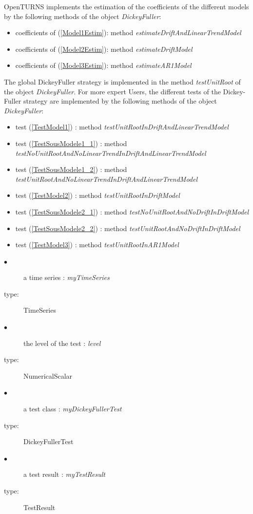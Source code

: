OpenTURNS implements the estimation of the coefficients of the different models by the following methods of the object \emph{DickeyFuller}:
\begin{itemize}
\item coefficients of (\ref{Model1Estim}): method \emph{estimateDriftAndLinearTrendModel}
\item coefficients of (\ref{Model2Estim}): method \emph{estimateDriftModel}
\item coefficients of (\ref{Model3Estim}): method \emph{estimateAR1Model}
\end{itemize}


The global DickeyFuller strategy  is implemented in the method \emph{testUnitRoot} of the object \emph{DickeyFuller}. For more expert Users, the different tests of the Dickey-Fuller strategy are implemented by the following methods of the object \emph{DickeyFuller}:
\begin{itemize}
\item test (\ref{TestModel1}) : method \emph{testUnitRootInDriftAndLinearTrendModel}
\item test (\ref{TestSousModele1_1}) : method \emph{testNoUnitRootAndNoLinearTrendInDriftAndLinearTrendModel}
\item test (\ref{TestSousModele1_2}) : method \emph{testUnitRootAndNoLinearTrendInDriftAndLinearTrendModel}
\item test (\ref{TestModel2}) : method \emph{testUnitRootInDriftModel}
\item test (\ref{TestSousModele2_1}) : method \emph{testNoUnitRootAndNoDriftInDriftModel}
\item test (\ref{TestSousModele2_2}) : method \emph{testUnitRootAndNoDriftInDriftModel}
\item test (\ref{TestModel3}) : method \emph{testUnitRootInAR1Model}
\end{itemize}


\requirements
    {
      \begin{description}
      \item[$\bullet$] a time series : {\itshape myTimeSeries}
      \item[type:]  TimeSeries
      \end{description}

      \begin{description}
      \item[$\bullet$] the level of the test : {\itshape level}
      \item[type:]  NumericalScalar
      \end{description}
    }
    {
      \begin{description}
      \item[$\bullet$] a test class : {\itshape myDickeyFullerTest}
      \item[type:]  DickeyFullerTest
      \end{description}

      \begin{description}
      \item[$\bullet$] a test result : {\itshape myTestResult}
      \item[type:]  TestResult
      \end{description}
    }

